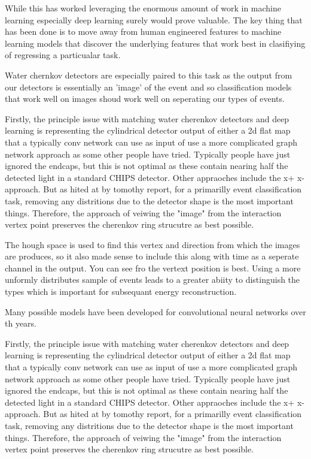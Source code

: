 While this has worked leveraging the enormous amount of work in machine learning especially deep learning
surely would prove valuable. The key thing that has been done is to move away from human engineered features
to machine learning models that discover the underlying features that work best in clasifiying of regressing
a particualar task.

Water chernkov detectors are especially paired to this task as the output from our detectors is essentially
an 'image' of the event and so classification models that work well on images shoud work well on
seperating our types of events.

Firstly, the principle issue with matching water cherenkov detectors and deep learning is representing the cylindrical
detector output of either a 2d flat map that a typically conv network can use as input of use a more complicated
graph network approach as some other people have tried. Typically people have just ignored the endcaps, but
this is not optimal as these contain nearing half the detected light in a standard CHIPS detector. Other appraoches
include the x+ x- approach. But as hited at by tomothy report, for a primarilly event classification task,
removing any distritions due to the detector shape is the most important things. Therefore, the approach of
veiwing the "image" from the interaction vertex point preserves the cherenkov ring strucutre as best possible.

The hough space is used to find this vertex and direction from which the images are produces, so it also made sense
to include this along with time as a seperate channel in the output. You can see fro the vertext position is best. Using
a more unformly distributes sample of events leads to a greater abiity to distinguish the types which is important
for subsequant energy reconstruction.

Many possible models have been developed for convolutional neural networks over th years.

Firstly, the principle issue with matching water cherenkov detectors and deep learning is representing the cylindrical
detector output of either a 2d flat map that a typically conv network can use as input of use a more complicated
graph network approach as some other people have tried. Typically people have just ignored the endcaps, but
this is not optimal as these contain nearing half the detected light in a standard CHIPS detector. Other appraoches
include the x+ x- approach. But as hited at by tomothy report, for a primarilly event classification task,
removing any distritions due to the detector shape is the most important things. Therefore, the approach of
veiwing the "image" from the interaction vertex point preserves the cherenkov ring strucutre as best possible.



